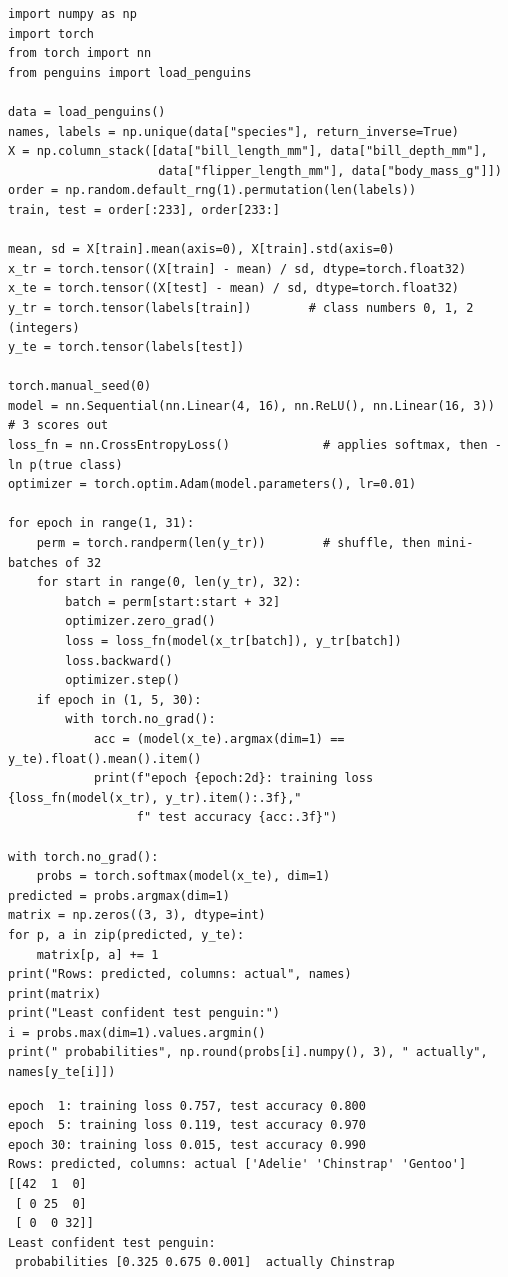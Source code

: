 \begin{verbatim}
import numpy as np
import torch
from torch import nn
from penguins import load_penguins

data = load_penguins()
names, labels = np.unique(data["species"], return_inverse=True)
X = np.column_stack([data["bill_length_mm"], data["bill_depth_mm"],
                     data["flipper_length_mm"], data["body_mass_g"]])
order = np.random.default_rng(1).permutation(len(labels))
train, test = order[:233], order[233:]

mean, sd = X[train].mean(axis=0), X[train].std(axis=0)
x_tr = torch.tensor((X[train] - mean) / sd, dtype=torch.float32)
x_te = torch.tensor((X[test] - mean) / sd, dtype=torch.float32)
y_tr = torch.tensor(labels[train])        # class numbers 0, 1, 2 (integers)
y_te = torch.tensor(labels[test])

torch.manual_seed(0)
model = nn.Sequential(nn.Linear(4, 16), nn.ReLU(), nn.Linear(16, 3))   # 3 scores out
loss_fn = nn.CrossEntropyLoss()             # applies softmax, then -ln p(true class)
optimizer = torch.optim.Adam(model.parameters(), lr=0.01)

for epoch in range(1, 31):
    perm = torch.randperm(len(y_tr))        # shuffle, then mini-batches of 32
    for start in range(0, len(y_tr), 32):
        batch = perm[start:start + 32]
        optimizer.zero_grad()
        loss = loss_fn(model(x_tr[batch]), y_tr[batch])
        loss.backward()
        optimizer.step()
    if epoch in (1, 5, 30):
        with torch.no_grad():
            acc = (model(x_te).argmax(dim=1) == y_te).float().mean().item()
            print(f"epoch {epoch:2d}: training loss {loss_fn(model(x_tr), y_tr).item():.3f},"
                  f" test accuracy {acc:.3f}")

with torch.no_grad():
    probs = torch.softmax(model(x_te), dim=1)
predicted = probs.argmax(dim=1)
matrix = np.zeros((3, 3), dtype=int)
for p, a in zip(predicted, y_te):
    matrix[p, a] += 1
print("Rows: predicted, columns: actual", names)
print(matrix)
print("Least confident test penguin:")
i = probs.max(dim=1).values.argmin()
print(" probabilities", np.round(probs[i].numpy(), 3), " actually", names[y_te[i]])
\end{verbatim}

\begin{verbatim}
epoch  1: training loss 0.757, test accuracy 0.800
epoch  5: training loss 0.119, test accuracy 0.970
epoch 30: training loss 0.015, test accuracy 0.990
Rows: predicted, columns: actual ['Adelie' 'Chinstrap' 'Gentoo']
[[42  1  0]
 [ 0 25  0]
 [ 0  0 32]]
Least confident test penguin:
 probabilities [0.325 0.675 0.001]  actually Chinstrap
\end{verbatim}

